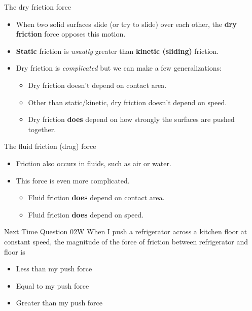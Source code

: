 \documentclass[english]{beamer}
\begin{document}
\begin{frame}{The dry friction force}
  \begin{itemize}
    \item When two solid surfaces slide (or try to slide) over each other, the \textbf{dry friction} force opposes this motion.
    \item \textbf{Static} friction is \emph{usually} greater than \textbf{kinetic (sliding)} friction.
    \item Dry friction is \emph{complicated} but we can make a few generalizations:
    \begin{itemize}
        \item Dry friction doesn't depend on contact area.
        \item Other than static/kinetic, dry friction doesn't depend on speed.
        \item Dry friction \textbf{does} depend on how strongly the surfaces are pushed together.
    \end{itemize}
  \end{itemize}
\end{frame}

\begin{frame}{The fluid friction (drag) force}
  \begin{itemize}
    \item Friction also occurs in fluids, such as air or water.
    \item This force is even more complicated.
    \begin{itemize}
        \item Fluid friction \textbf{does} depend on contact area.
        \item Fluid friction \textbf{does} depend on speed.
    \end{itemize}
  \end{itemize}
\end{frame}

\begin{frame}{Next Time Question 02W}
  When I push a refrigerator across a kitchen floor at constant speed,
  the magnitude of the force of friction between refrigerator and floor is\\
  \begin{itemize}
    \item Less than my push force
    \item Equal to my push force
    \item Greater than my push force
  \end{itemize}
\end{frame}
\end{document}
